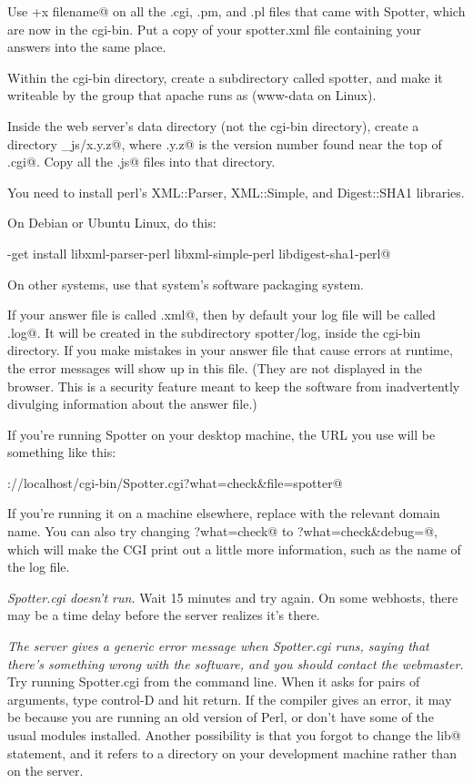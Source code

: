 \documentclass{doc}
\begin{document}
Use \verb@chmod +x filename@ on all the .cgi, .pm, and .pl files that
came with Spotter, which are now in the cgi-bin. Put a copy of your spotter.xml file
containing your answers into the same place.

Within the cgi-bin directory, create a subdirectory called spotter, and make it
writeable by the group that apache runs as (www-data on Linux).

Inside the web server's data directory (not the cgi-bin directory), create
a directory \verb@spotter_js/x.y.z@, where \verb@x.y.z@ is the version number found
near the top of \verb@Spotter.cgi@.
Copy all the \verb@.js@ files into that directory.

You need to install perl's XML::Parser, XML::Simple, and Digest::SHA1 libraries.

On Debian or Ubuntu Linux, do this:

\verb@apt-get install libxml-parser-perl libxml-simple-perl libdigest-sha1-perl@

On other systems, use that system's software packaging system.


If your answer file is called \verb@spotter.xml@, then by default your log file will be
called \verb@spotter.log@. It will be created in the subdirectory spotter/log, inside the
cgi-bin directory.
If you make mistakes in your answer file that cause errors at runtime, the error
messages will show up in this file. (They are not displayed in the browser. This
is a security feature meant to keep the software from inadvertently divulging
information about the answer file.)

If you're running Spotter on your desktop machine, the URL you use will be
something like this:

\noindent\verb@http://localhost/cgi-bin/Spotter.cgi?what=check&file=spotter@

If you're running it on a machine elsewhere, replace \verb@localhost@ with the
relevant domain name. You can also try changing \verb@?what=check@ to
\verb@?what=check&debug=@, which will make the CGI print out a little
more information, such as the name of the log file.

\emph{Spotter.cgi doesn't run.} Wait 15 minutes and try again. On some webhosts,
there may be a time delay before the server realizes it's there.

\emph{The server gives a generic error message when Spotter.cgi runs, saying
that there's something wrong with the software, and you should contact the
webmaster.} Try running Spotter.cgi from the command line. When it asks
for pairs of arguments, type control-D and hit return. If the compiler gives
an error, it may be because you are running an old version of Perl, or don't
have some of the usual modules installed. Another possibility is that you
forgot to change the \verb@use lib@ statement, and 
it refers to a directory on your development machine rather than on
the server.
\end{document}
